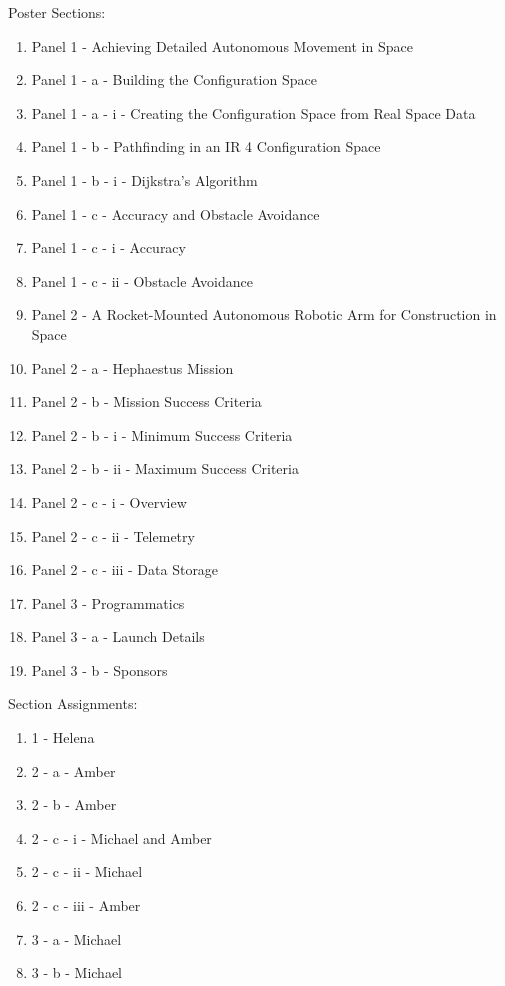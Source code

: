 Poster Sections: \\
\begin{enumerate}
\item{Panel 1 - Achieving Detailed Autonomous Movement in Space}
\item{Panel 1 - a - Building the Configuration Space}
\item{Panel 1 - a - i - Creating the Configuration Space from Real Space Data}
\item{Panel 1 - b - Pathfinding in an IR 4 Configuration Space}
\item{Panel 1 - b - i - Dijkstra's Algorithm}
\item{Panel 1 - c - Accuracy and Obstacle Avoidance}
\item{Panel 1 - c - i - Accuracy}
\item{Panel 1 - c - ii - Obstacle Avoidance}
\item{Panel 2 - A Rocket-Mounted Autonomous Robotic Arm for Construction in Space}
\item{Panel 2 - a - Hephaestus Mission}
\item{Panel 2 - b - Mission Success Criteria}
\item{Panel 2 - b - i - Minimum Success Criteria}
\item{Panel 2 - b - ii - Maximum Success Criteria}
\item{Panel 2 - c - i - Overview}
\item{Panel 2 - c - ii - Telemetry}
\item{Panel 2 - c - iii - Data Storage}
\item{Panel 3 - Programmatics}
\item{Panel 3 - a - Launch Details}
\item{Panel 3 - b - Sponsors}
\end{enumerate}

Section Assignments: \\
\begin{enumerate}
\item{1 - Helena}
\item{2 - a - Amber}
\item{2 - b - Amber}
\item{2 - c - i - Michael and Amber}
\item{2 - c - ii - Michael}
\item{2 - c - iii - Amber}
\item{3 - a - Michael}
\item{3 - b - Michael}
\end{enumerate}

